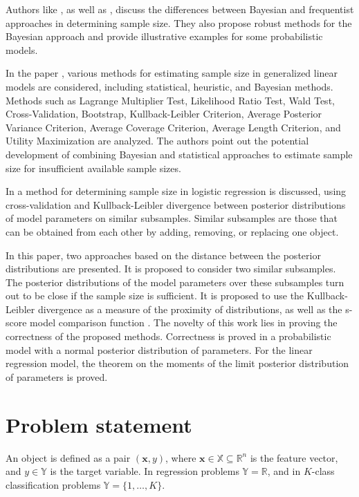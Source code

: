 \documentclass[
11pt,%
tightenlines,%
twoside,%
onecolumn,%
nofloats,%
nobibnotes,%
nofootinbib,%
superscriptaddress,%
noshowpacs,%
centertags]%
{revtex4-2}
\begin{document}
Authors like \cite{Brutti2014}, as well as \cite{Pezeshk2008}, discuss the differences between Bayesian and frequentist approaches in determining sample size. They also propose robust methods for the Bayesian approach and provide illustrative examples for some probabilistic models.

In the paper \cite{Grabovoy2022}, various methods for estimating sample size in generalized linear models are considered, including statistical, heuristic, and Bayesian methods. Methods such as Lagrange Multiplier Test, Likelihood Ratio Test, Wald Test, Cross-Validation, Bootstrap, Kullback-Leibler Criterion, Average Posterior Variance Criterion, Average Coverage Criterion, Average Length Criterion, and Utility Maximization are analyzed. The authors point out the potential development of combining Bayesian and statistical approaches to estimate sample size for insufficient available sample sizes.

In \cite{MOTRENKO2014743} a method for determining sample size in logistic regression is discussed, using cross-validation and Kullback-Leibler divergence between posterior distributions of model parameters on similar subsamples. Similar subsamples are those that can be obtained from each other by adding, removing, or replacing one object.

In this paper, two approaches based on the distance between the posterior distributions are presented. It is proposed to consider two similar subsamples. The posterior distributions of the model parameters over these subsamples turn out to be close if the sample size is sufficient. It is proposed to use the Kullback-Leibler divergence \cite{MOTRENKO2014743} as a measure of the proximity of distributions, as well as the s-score model comparison function \cite{Aduenko2017}. The novelty of this work lies in proving the correctness of the proposed methods. Correctness is proved in a probabilistic model with a normal posterior distribution of parameters. For the linear regression model, the theorem on the moments of the limit posterior distribution of parameters is proved.

\section{Problem statement}

An object is defined as a pair $(\mathbf{x}, y)$, where $\mathbf{x} \in \mathbb{X} \subseteq \mathbb{R}^n$ is the feature vector, and $y \in \mathbb{Y}$ is the target variable. In regression problems $\mathbb{Y} = \mathbb{R}$, and in $K$-class classification problems $\mathbb{Y} = \{1, \ldots, K\}$.
\end{document}
